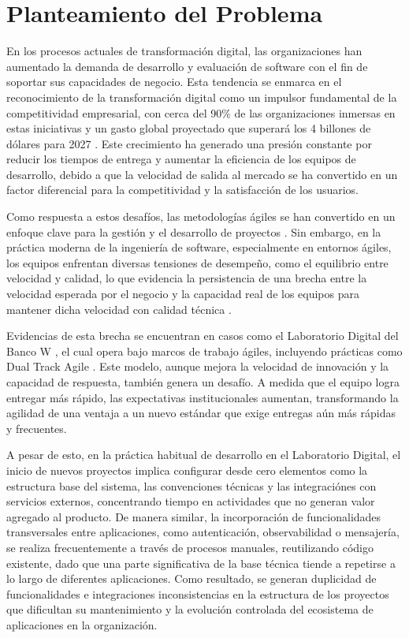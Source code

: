 
\section{Planteamiento del Problema}

En los procesos actuales de transformación digital, las organizaciones han aumentado la demanda de desarrollo y evaluación de software con el fin de soportar sus capacidades de negocio. Esta tendencia se enmarca en el reconocimiento de la transformación digital como un impulsor fundamental de la competitividad empresarial, con cerca del 90\% de las organizaciones inmersas en estas iniciativas y un gasto global proyectado que superará los 4 billones de dólares para 2027 \citep{Jie2025}. Este crecimiento ha generado una presión constante por reducir los tiempos de entrega y aumentar la eficiencia de los equipos de desarrollo, debido a que la velocidad de salida al mercado se ha convertido en un factor diferencial para la competitividad y la satisfacción de los usuarios.

Como respuesta a estos desafíos, las metodologías ágiles se han convertido en un enfoque clave para la gestión y el desarrollo de proyectos \citep{Palopak2024}. Sin embargo, en la práctica moderna de la ingeniería de software, especialmente en entornos ágiles, los equipos enfrentan diversas tensiones de desempeño, como el equilibrio entre velocidad y calidad, lo que evidencia la persistencia de una brecha entre la velocidad esperada por el negocio y la capacidad real de los equipos para mantener dicha velocidad con calidad técnica \citep{Armbruster2025}.

Evidencias de esta brecha se encuentran en casos como el Laboratorio Digital del Banco W \citep{UniversidadIcesi2023}, el cual opera bajo marcos de trabajo ágiles, incluyendo prácticas como Dual Track Agile \citep{MartyCagan2012}. Este modelo, aunque mejora la velocidad de innovación y la capacidad de respuesta, también genera un desafío. A medida que el equipo logra entregar más rápido, las expectativas institucionales aumentan, transformando la agilidad de una ventaja a un nuevo estándar que exige entregas aún más rápidas y frecuentes.

A pesar de esto, en la práctica habitual de desarrollo en el Laboratorio Digital, el inicio de nuevos proyectos implica configurar desde cero elementos como la estructura base del sistema, las convenciones técnicas y las integraciónes con servicios externos, concentrando tiempo en actividades que no generan valor agregado al producto. De manera similar, la incorporación de funcionalidades transversales entre aplicaciones, como autenticación, observabilidad o mensajería, se realiza frecuentemente a través de procesos manuales, reutilizando código existente, dado que una parte significativa de la base técnica tiende a repetirse a lo largo de diferentes aplicaciones. Como resultado, se generan duplicidad de funcionalidades e integraciones inconsistencias en la estructura de los proyectos que dificultan su mantenimiento y la evolución controlada del ecosistema de aplicaciones en la organización.

